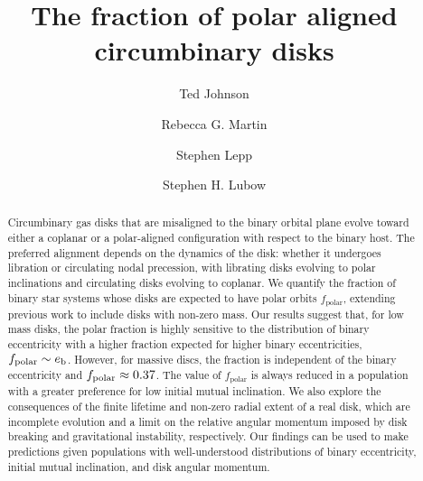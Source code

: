 \documentclass[twocolumn]{aastex631}
\begin{document}
\title{The fraction of polar aligned circumbinary disks}

\author[0000-0002-1570-2203]{Ted Johnson}
\author[0000-0003-2401-7168]{Rebecca G. Martin}
\author[0000-0003-2270-1310]{Stephen Lepp}
\author[0000-0002-4636-7348]{Stephen H. Lubow}

\begin{abstract}

    Circumbinary gas disks that are misaligned to the binary orbital plane evolve toward either a coplanar or a polar-aligned configuration with respect to the binary host. The preferred alignment depends on the dynamics of the disk: whether it undergoes libration or circulating nodal precession, with librating disks evolving to polar inclinations and circulating disks evolving to coplanar.
    We quantify the fraction of binary star systems whose disks are expected to have polar orbits $f_\text{polar}$, extending previous work to include disks with non-zero mass.
    Our results suggest that, for low mass disks, the polar fraction is highly sensitive to the distribution of binary eccentricity with a higher fraction expected for higher binary eccentricities, $f_{\rm polar}\sim e_{\rm b}$. However, for massive discs, the fraction is independent of the binary eccentricity and $f_{\rm polar}\approx 0.37$. The value of $f_\text{polar}$ is always reduced in a population with a greater preference for low initial mutual inclination.
    We also explore the consequences of the finite lifetime and non-zero radial extent of a real disk, which are incomplete evolution and a limit on the relative angular momentum imposed by disk breaking and gravitational instability, respectively. Our findings can be used to make predictions given populations with well-understood distributions of binary eccentricity, initial mutual inclination, and disk angular momentum.
\end{abstract}
\end{document}
